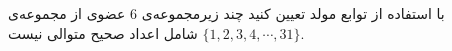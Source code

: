     \p 
با استفاده از توابع مولد تعیین کنید چند زیرمجموعه‌ی
$6$
عضوی از مجموعه‌ی
$\{1, 2, 3, 4, \cdots, 31\}$
شامل اعداد صحیح متوالی نیست.